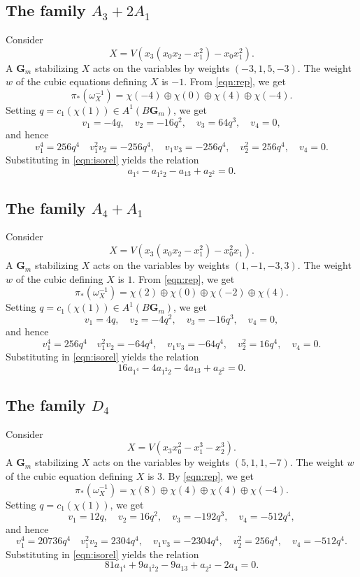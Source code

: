 \documentclass[12pt,reqno]{amsart}
\numberwithin{equation}{section}
\newcommand{\G}{\mathbf G}
\begin{document}
\subsection{The family $A_3 + 2A_1$}
Consider
\[ X = V(x_3(x_0x_2-x_1^2) - x_0x_1^2).\]
A $\G_m$ stabilizing $X$ acts on the variables by weights $(-3,1,5,-3)$.
The weight $w$ of the cubic equations defining $X$ is $-1$.
From \eqref{eqn:rep}, we get
\[ \pi_*\left( \omega_X^{-1} \right) = \chi(-4) \oplus \chi(0) \oplus \chi(4) \oplus \chi(-4).\]
Setting $q = c_1(\chi(1)) \in A^1(B\G_m)$, we get
\[ v_1 = -4q, \quad v_2 = -16q^2, \quad v_3 = 64q^3, \quad v_4 = 0,\]
and hence
\[ v_1^4 = 256q^4 \quad v_1^2v_2 = -256q^4, \quad v_1v_3 = -256q^4, \quad v_2^2 = 256q^4, \quad v_4 = 0.\]
Substituting in \eqref{eqn:isorel} yields the relation
\begin{equation}\label{eqn:iso2}
  a_{1^4} - a_{1^2 2}- a_{13} +  a_{2^2}  = 0.
\end{equation}

\subsection{The family $A_4 + A_1$}
Consider
\[ X = V(x_3(x_0x_2-x_1^2) - x_0^2x_1).\]
A $\G_m$ stabilizing $X$ acts on the variables by weights $(1,-1,-3,3)$.
The weight $w$ of the cubic defining $X$ is $1$.
From \eqref{eqn:rep}, we get
\[ \pi_*\left( \omega_X^{-1} \right) = \chi(2) \oplus \chi(0) \oplus \chi(-2) \oplus \chi(4).\]
Setting $q = c_1(\chi(1)) \in A^1(B\G_m)$, we get
\[ v_1 = 4q, \quad v_2 = -4q^2, \quad v_3 = -16q^3, \quad v_4 = 0,\]
and hence
\[ v_1^4 = 256q^4 \quad v_1^2v_2 = -64q^4, \quad v_1v_3 = -64q^4, \quad v_2^2 = 16q^4, \quad v_4 = 0.\]
Substituting in \eqref{eqn:isorel} yields the relation
\begin{equation}\label{eqn:iso3}
  16a_{1^4} -4a_{1^2 2}- 4a_{13} + a_{2^2}  = 0.
\end{equation}

\subsection{The family $D_4$}
Consider
\[ X = V(x_3x_0^2 - x_1^3-x_2^3).\]
A $\G_m$ stabilizing $X$ acts on the variables by weights $(5,1,1,-7)$.
The weight $w$ of the cubic equation defining $X$ is $3$.
By \eqref{eqn:rep}, we get
\[ \pi_*\left( \omega_X^{-1} \right) = \chi(8) \oplus \chi(4) \oplus \chi(4) \oplus \chi(-4).\]
Setting $q = c_1(\chi(1))$, we get
\[ v_1 = 12q, \quad v_2 = 16q^2, \quad v_3 = -192q^3, \quad v_4 = -512q^4,\]
and hence
\[ v_1^4 = 20736q^4 \quad v_1^2v_2 = 2304q^4, \quad v_1v_3 = -2304q^4, \quad v_2^2 = 256q^4, \quad v_4 = -512q^4.\]
Substituting in \eqref{eqn:isorel} yields the relation
\begin{equation}\label{eqn:iso4}
  81a_{1^4} +9a_{1^2 2}- 9a_{13} +  a_{2^2}-2a_4  = 0.
\end{equation}
\end{document}
